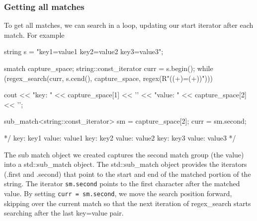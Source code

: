 \documentclass{report}
\begin{document}
    \subsubsection{Getting all matches}
    \bigbreak \noindent 
    To get all matches, we can search in a loop, updating our start iterator after each match. For example
    \bigbreak \noindent 
    \begin{cppcode}
        string s = "key1=value1 key2=value2 key3=value3";

        smatch capture_space;
        string::const_iterator curr = s.begin();
        while (regex_search(curr, s.cend(), capture_space, regex(R"(\s*(\w+)=(\w+)\s*)"))) {
            cout << "key: " << capture_space[1] << '\n' << "value: " << capture_space[2] << '\n';

            sub_match<string::const_iterator> sm = capture_space[2];
            curr = sm.second;

            */ 
                key: key1
                value: value1
                key: key2
                value: value2
                key: key3
                value: value3
            */
        }
    \end{cppcode}
    \bigbreak \noindent 
    The sub match object we created captures the second match group (the value) into a std::sub\_match object. The std::sub\_match object provides the iterators (.first and .second) that point to the start and end of the matched portion of the string.
    \bigbreak \noindent 
    The iterator \texttt{sm.second} points to the first character after the matched value. By setting \texttt{curr = sm.second}, we move the search position forward, skipping over the current match so that the next iteration of regex\_search starts searching after the last key=value pair.

    \pagebreak 
\end{document}
